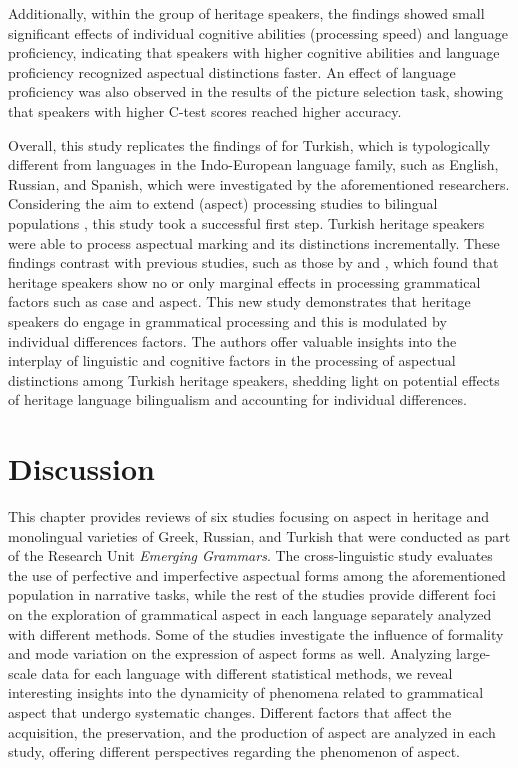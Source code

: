 \documentclass[output=paper,colorlinks,citecolor=brown]{langscibook}
\begin{document}
Additionally, within the group of heritage speakers, the findings showed small significant effects of individual cognitive abilities (processing speed) and language proficiency, indicating that speakers with higher cognitive abilities and language proficiency recognized aspectual distinctions faster. An effect of language proficiency was also observed in the results of the picture selection task, showing that speakers with higher C-test scores reached higher accuracy.

Overall, this study replicates the findings of \textcite{minor2022fine, minor2023aspect} for Turkish, which is typologically different from languages in the Indo-European language family, such as English, Russian, and Spanish, which were investigated by the aforementioned researchers. Considering the aim to extend (aspect) processing studies to bilingual populations \parencite{Bayram_2021}, this study took a successful first step. Turkish heritage speakers were able to process aspectual marking and its distinctions incrementally. These findings contrast with previous studies, such as those by \textcite{karaca2024morphosyntactic} and \textcite{ozsoy2023turkish}, which found that heritage speakers show no or only marginal effects in processing grammatical factors such as case and aspect. This new study demonstrates that heritage speakers do engage in grammatical processing and this is modulated by individual differences factors. The authors offer valuable insights into the interplay of linguistic and cognitive factors in the processing of aspectual distinctions among Turkish heritage speakers, shedding light on potential effects of heritage language bilingualism and accounting for individual differences.

\section{Discussion} \label{aspectDiscussion}
    
This chapter provides reviews of six studies focusing on aspect in heritage and monolingual varieties of Greek, Russian, and Turkish that were conducted as part of the Research Unit \textit{Emerging Grammars}. The cross-linguistic study evaluates the use of perfective and imperfective aspectual forms among the aforementioned population in narrative tasks, while the rest of the studies provide different foci on the exploration of grammatical aspect in each language separately analyzed with different methods. Some of the studies investigate the influence of formality and mode variation on the expression of aspect forms as well. Analyzing large-scale data for each language with different statistical methods, we reveal interesting insights into the dynamicity of phenomena related to grammatical aspect that undergo systematic changes. Different factors that affect the acquisition, the preservation, and the production of aspect are analyzed in each study, offering different perspectives regarding the phenomenon of aspect.  
\end{document}
